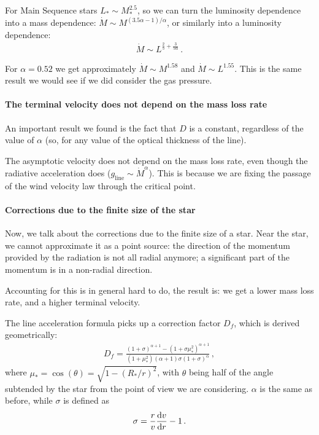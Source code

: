 \documentclass[main.tex]{subfiles}
\begin{document}
For Main Sequence stars \(L_{*} \sim M_{*}^{2.5}\), so we can turn the luminosity dependence into a mass dependence: \(\dot{M} \sim M^{(3.5 \alpha  - 1 ) / \alpha }\), or similarly into a luminosity dependence: 
%
\begin{align}
\dot{M} \sim L^{\frac{2}{5} + \frac{3}{5 \alpha }}
\,.
\end{align}
%

For \(\alpha = 0.52\) we get approximately \(\dot{M} \sim M^{1.58}\) and \(\dot{M} \sim L^{1.55}\).
This is the same result we would see if we did consider the gas pressure.

\paragraph{The terminal velocity does not depend on the mass loss rate}
An important result we found is the fact that \(D\) is a constant, regardless of the value of \(\alpha \) (so, for any value of the optical thickness of the line). 

The asymptotic velocity does not depend on the mass loss rate, even though the radiative acceleration does (\(g _{\text{line}} \sim \dot{M}^{\alpha }\)).
This is because we are fixing the passage of the wind velocity law through the critical point.

\paragraph{Corrections due to the finite size of the star}

Now, we talk about the corrections due to the finite size of a star. Near the star, we cannot approximate it as a point source: the direction of the momentum provided by the radiation is not all radial anymore; a significant part of the momentum is in a non-radial direction.

Accounting for this is in general hard to do, the result is: we get a lower mass loss rate, and a higher terminal velocity. 

The line acceleration formula picks up a correction factor \(D_f\), which is derived geometrically: 
%
\begin{align}
D_f = \frac{(1+\sigma )^{\alpha +1 } - (1+\sigma \mu_{*}^2)^{\alpha +1}}{ (1 + \mu_{*}^2) (\alpha +1) \sigma (1+\sigma )^{\alpha }}
\,,
\end{align}
%
where \(\mu_{*} = \cos(\theta ) = \sqrt{1 - (R_{*} /r)^2}\),
with \(\theta \) being half of the angle subtended by the star from the point of view we are considering. \(\alpha \) is the same as before, while \(\sigma \) is defined as 
%
\begin{align}
\sigma = \frac{r}{v} \dv{v}{r}  -1
\,.
\end{align}
%
\end{document}
